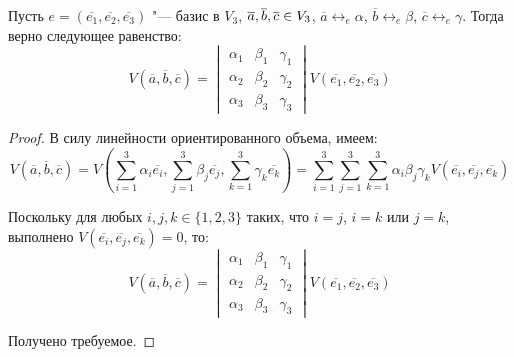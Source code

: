 \begin{theorem}
	Пусть $e = (\overline{e_1}, \overline{e_2}, \overline{e_3})$ "--- базис в $V_3$, $\overline{a}, \overline{b}, \overline{c} \hm{\in} V_3$, $\overline{a} \leftrightarrow_{e} \alpha$, $\overline{b} \leftrightarrow_{e} \beta$, $\overline{c} \leftrightarrow_{e} \gamma$. Тогда верно следующее равенство:
	\[V(\overline{a}, \overline{b}, \overline{c}) = \begin{vmatrix}
	\alpha_1 & \beta_1 & \gamma_1\\
	\alpha_2 & \beta_2 & \gamma_2\\
	\alpha_3 & \beta_3 & \gamma_3
	\end{vmatrix}V(\overline{e_1}, \overline{e_2}, \overline{e_3})\]
\end{theorem}

\begin{proof}
	В силу линейности ориентированного объема, имеем:
	\[V(\overline{a}, \overline{b}, \overline{c}) = V\left(\sum_{i = 1}^{3} \alpha_i\overline{e_i}, \sum_{j = 1}^{3} \beta_j\overline{e_j},  \sum_{k = 1}^{3} \gamma_k\overline{e_k}\right) = \sum_{i = 1}^{3} \sum_{j = 1}^{3}\sum_{k = 1}^{3}\alpha_i\beta_j\gamma_kV(\overline{e_i}, \overline{e_j}, \overline{e_k})\]
	
	Поскольку для любых $i, j, k \in \{1, 2, 3\}$ таких, что $i = j$, $i = k$ или $j = k$, выполнено $V(\overline{e_i}, \overline{e_j}, \overline{e_k}) = 0$, то:
	\[V(\overline{a}, \overline{b}, \overline{c}) = \begin{vmatrix}
	\alpha_1 & \beta_1 & \gamma_1\\
	\alpha_2 & \beta_2 & \gamma_2\\
	\alpha_3 & \beta_3 & \gamma_3
	\end{vmatrix}V(\overline{e_1}, \overline{e_2}, \overline{e_3})\]

	Получено требуемое.
\end{proof}

